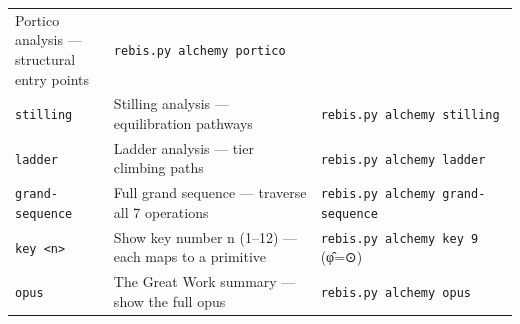 \begin{longtable}[]{@{}lll@{}}
\begin{minipage}[t]{0.35\columnwidth}
Portico analysis --- structural entry points\strut
\end{minipage} & \begin{minipage}[t]{0.24\columnwidth}\raggedright
\texttt{rebis.py\ alchemy\ portico}\strut
\end{minipage}\tabularnewline
\begin{minipage}[t]{0.32\columnwidth}\raggedright
\texttt{stilling}\strut
\end{minipage} & \begin{minipage}[t]{0.35\columnwidth}\raggedright
Stilling analysis --- equilibration pathways\strut
\end{minipage} & \begin{minipage}[t]{0.24\columnwidth}\raggedright
\texttt{rebis.py\ alchemy\ stilling}\strut
\end{minipage}\tabularnewline
\begin{minipage}[t]{0.32\columnwidth}\raggedright
\texttt{ladder}\strut
\end{minipage} & \begin{minipage}[t]{0.35\columnwidth}\raggedright
Ladder analysis --- tier climbing paths\strut
\end{minipage} & \begin{minipage}[t]{0.24\columnwidth}\raggedright
\texttt{rebis.py\ alchemy\ ladder}\strut
\end{minipage}\tabularnewline
\begin{minipage}[t]{0.32\columnwidth}\raggedright
\texttt{grand-sequence}\strut
\end{minipage} & \begin{minipage}[t]{0.35\columnwidth}\raggedright
Full grand sequence --- traverse all 7 operations\strut
\end{minipage} & \begin{minipage}[t]{0.24\columnwidth}\raggedright
\texttt{rebis.py\ alchemy\ grand-sequence}\strut
\end{minipage}\tabularnewline
\begin{minipage}[t]{0.32\columnwidth}\raggedright
\texttt{key\ \textless{}n\textgreater{}}\strut
\end{minipage} & \begin{minipage}[t]{0.35\columnwidth}\raggedright
Show key number n (1--12) --- each maps to a primitive\strut
\end{minipage} & \begin{minipage}[t]{0.24\columnwidth}\raggedright
\texttt{rebis.py\ alchemy\ key\ 9} (φ̂=⊙)\strut
\end{minipage}\tabularnewline
\begin{minipage}[t]{0.32\columnwidth}\raggedright
\texttt{opus}\strut
\end{minipage} & \begin{minipage}[t]{0.35\columnwidth}\raggedright
The Great Work summary --- show the full opus\strut
\end{minipage} & \begin{minipage}[t]{0.24\columnwidth}\raggedright
\texttt{rebis.py\ alchemy\ opus}\strut
\end{minipage}\tabularnewline
\bottomrule
\end{longtable}

